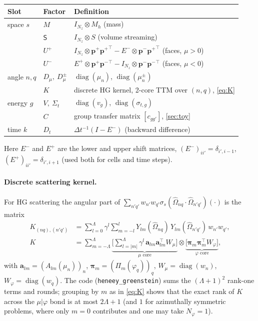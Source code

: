 \documentclass[11pt,a4paper]{article}
\numberwithin{equation}{section}
\theoremstyle{remark}
\newcommand{\Om}{\hat{\Omega}}
\newcommand{\kron}{\otimes}
\newcommand{\Lmax}{\Lambda}
\newcommand{\pp}{{\bm{p}^{+}}}
\newcommand{\pmn}{{\bm{p}^{-}}}
\newcommand{\diag}{\operatorname{diag}}
\begin{document}
\begin{center}\small
\renewcommand{\arraystretch}{1.35}
\begin{tabular}{@{}lll@{}}
\toprule
Slot & Factor & Definition \\
\midrule
space $s$ & $M$ & $I_{N_z}\kron M_h$ \hfill (mass) \\
 & $\mathsf{S}$ & $I_{N_z}\kron S$ \hfill (volume streaming) \\
 & $U^{+}$ & $I_{N_z}\kron\pp\pp^{\!\top}-E^{-}\kron\pmn\pp^{\!\top}$ \hfill (faces, $\mu>0$) \\
 & $U^{-}$ & $E^{+}\kron\pp\pmn^{\!\top}-I_{N_z}\kron\pmn\pmn^{\!\top}$ \hfill (faces, $\mu<0$) \\
angle $n,q$ & $D_\mu,\ D_\mu^{\pm}$ & $\diag(\mu_n)$, $\diag(\mu_n^\pm)$ \\
 & $K$ & discrete HG kernel, 2-core TTM over $(n,q)$, \cref{eq:K} \\
energy $g$ & $V,\ \Sigma_t$ & $\diag(v_g)$, $\diag(\sigma_{t,g})$ \\
 & $C$ & group transfer matrix $[c_{gg'}]$, \cref{sec:toy} \\
time $k$ & $D_t$ & $\Delta t^{-1}(I-E^-)$ \hfill (backward difference) \\
\bottomrule
\end{tabular}
\end{center}
Here $E^-$ and $E^+$ are the lower and upper shift matrices, $(E^-)_{ii'}=\delta_{i',i-1}$, $(E^+)_{ii'}=\delta_{i',i+1}$ (used both for cells and time steps).

\paragraph{Discrete scattering kernel.}
For HG scattering the angular part of $\sum_{n'q'}w_{n'}w_{q'}\sigma_s(\Om_{nq}\cdot\Om_{n'q'})(\cdot)$ is the matrix
\begin{equation}
\begin{aligned}
K_{(nq),(n'q')}&=\sum_{l=0}^{\Lmax}\gamma^l\sum_{m=-l}^{l}Y_{lm}(\Om_{nq})\,Y_{lm}(\Om_{n'q'})\,w_{n'}w_{q'},\\
K&=\sum_{m=-\Lmax}^{\Lmax}\underbrace{\Big[\sum_{l=|m|}^{\Lmax}\gamma^l\,\bm a_{lm}\bm a_{lm}^{\!\top}W_\mu\Big]}_{\mu\text{ core}}\kron\underbrace{\big[\bm\pi_m\bm\pi_m^{\!\top}W_\varphi\big]}_{\varphi\text{ core}},
\end{aligned}
\label{eq:K}
\end{equation}
with $\bm a_{lm}=(A_{lm}(\mu_n))_n$, $\bm\pi_m=(\Pi_m(\varphi_q))_q$, $W_\mu=\diag(w_n)$, $W_\varphi=\diag(w_q)$.
The code (\texttt{heneey\_greenstein}) sums the $(\Lmax+1)^2$ rank-one terms and rounds; grouping by $m$ as in \eqref{eq:K} shows that the exact rank of $K$ across the $\mu|\varphi$ bond is at most $2\Lmax+1$ (and $1$ for azimuthally symmetric problems, where only $m=0$ contributes and one may take $N_\varphi=1$).
\end{document}
